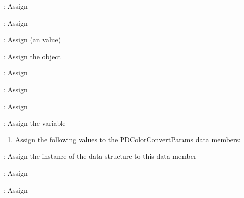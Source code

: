 \documentclass[letterpaper,12pt,english,openany,oneside]{sphinxmanual}
\begin{document}
: Assign 

: Assign 

: Assign  (an  value)

: Assign the  object

: Assign 

: Assign 

: Assign 

: Assign the  variable
\begin{enumerate}
%
\setcounter{enumi}{5}
\item {} 
Assign the following values to the PDColorConvertParams data members:

\end{enumerate}

: Assign the instance of the  data structure to this data member

: Assign 

: Assign 
\end{document}
